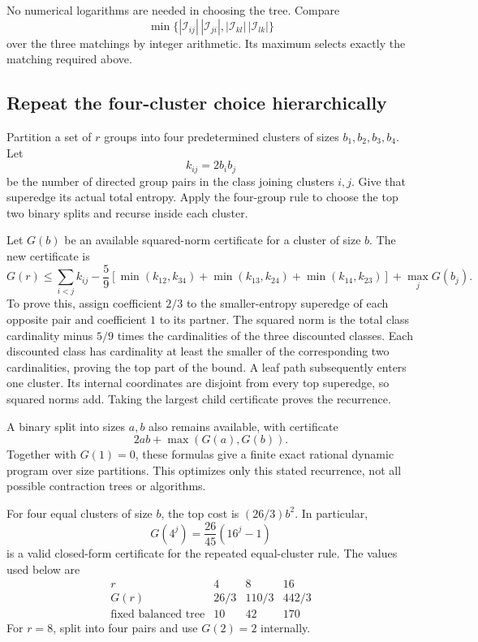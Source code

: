 No numerical logarithms are needed in choosing the tree. Compare
\[
 \min\{|\mathcal I_{ij}|\,|\mathcal I_{ji}|,
          |\mathcal I_{kl}|\,|\mathcal I_{lk}|\}
\]
over the three matchings by integer arithmetic. Its maximum selects exactly
the matching required above.

\subsection{Repeat the four-cluster choice hierarchically}
Partition a set of $r$ groups into four predetermined clusters of sizes
$b_1,b_2,b_3,b_4$. Let
\[
 k_{ij}=2b_i b_j
\]
be the number of directed group pairs in the class joining clusters $i,j$.
Give that superedge its actual total entropy. Apply the four-group rule
to choose the top two binary splits and recurse inside each cluster.

Let $G(b)$ be an available squared-norm certificate for a cluster of size
$b$. The new certificate is
\begin{equation}\label{eq:new-unequal-recurrence}
 G(r)\le
 \sum_{i<j}k_{ij}
 -\frac59\left[
  \min(k_{12},k_{34})+\min(k_{13},k_{24})+\min(k_{14},k_{23})\right]
 +\max_j G(b_j).
\end{equation}
To prove this, assign coefficient $2/3$ to the smaller-entropy superedge
of each opposite pair and coefficient $1$ to its partner. The squared norm
is the total class cardinality minus $5/9$ times the cardinalities of the
three discounted classes. Each discounted class has cardinality at least
the smaller of the corresponding two cardinalities, proving the top part
of the bound. A leaf path subsequently enters one cluster. Its internal
coordinates are disjoint from every top superedge, so squared norms add.
Taking the largest child certificate proves the recurrence.

A binary split into sizes $a,b$ also remains available, with certificate
\[
 2ab+\max(G(a),G(b)).
\]
Together with $G(1)=0$, these formulas give a finite exact rational dynamic
program over size partitions. This optimizes only this stated recurrence,
not all possible contraction trees or algorithms.

For four equal clusters of size $b$, the top cost is $(26/3)b^2$.
In particular,
\[
 G(4^j)=\frac{26}{45}(16^j-1)
\]
is a valid closed-form certificate for the repeated equal-cluster rule.
The values used below are
\[
 \begin{array}{c|ccc}
 r&4&8&16\\\hline
 G(r)&26/3&110/3&442/3\\
 \text{fixed balanced tree}&10&42&170
 \end{array}
\]
For $r=8$, split into four pairs and use $G(2)=2$ internally.

